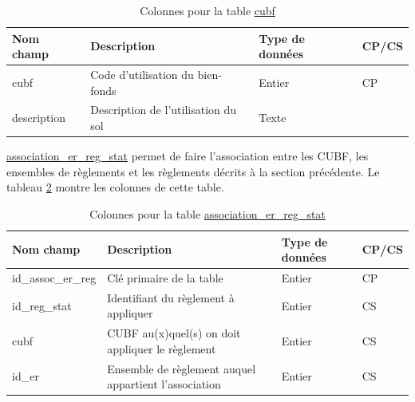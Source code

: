     \begin{table}[h]
       \centering
       \begin{tabular}{m{}|m{}m{}m{}}
            \hline
            Nom champ & Description & Type de données & CP/CS  \\
            \hline
            cubf & Code d'utilisation du bien-fonds & Entier & CP \\  
            description & Description de l'utilisation du sol & Texte & \\
            \hline
       \end{tabular}
       \caption{Colonnes pour la table \underline{cubf}}
       \label{tab:definition_cubf}
    \end{table}   
   \clearpage
    \underline{association\_er\_reg\_stat} permet de faire l'association entre les \ac{CUBF}, les ensembles de règlements et les règlements décrits à la section précédente. Le tableau \ref{tab:definition_association_er_reg_stat} montre les colonnes de cette table.\par
    \begin{table}[h]
       \centering
       \begin{tabular}{m{}|m{}m{}m{}}
            \hline
            Nom champ & Description & Type de données & CP/CS  \\
            \hline
            id\_assoc\_er\_reg & Clé primaire de la table & Entier & CP \\  
            id\_reg\_stat & Identifiant du règlement à appliquer & Entier & CS \\
            cubf & \ac{CUBF} au(x)quel(s) on doit appliquer le règlement & Entier & CS\\
            id\_er & Ensemble de règlement auquel appartient l'association & Entier & CS\\
            \hline
       \end{tabular}
       \caption{Colonnes pour la table \underline{association\_er\_reg\_stat}}
       \label{tab:definition_association_er_reg_stat}
    \end{table}   
    \FloatBarrier
   
